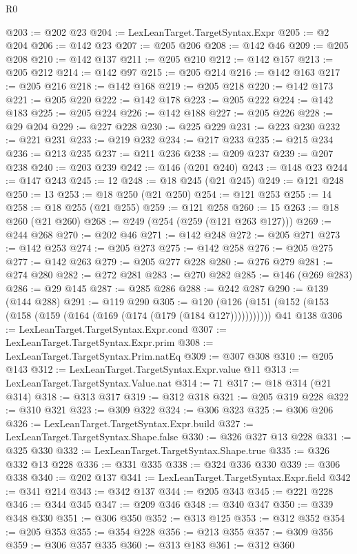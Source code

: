 \begin{lexlean}{R0}
\begin{coremodule}
@203 := @202 @23
@204 := LexLeanTarget.TargetSyntax.Expr
@205 := @2 @204
@206 := @142 @23
@207 := @205 @206
@208 := @142 @46
@209 := @205 @208
@210 := @142 @137
@211 := @205 @210
@212 := @142 @157
@213 := @205 @212
@214 := @142 @97
@215 := @205 @214
@216 := @142 @163
@217 := @205 @216
@218 := @142 @168
@219 := @205 @218
@220 := @142 @173
@221 := @205 @220
@222 := @142 @178
@223 := @205 @222
@224 := @142 @183
@225 := @205 @224
@226 := @142 @188
@227 := @205 @226
@228 := @29 @204
@229 := @227 @228
@230 := @225 @229
@231 := @223 @230
@232 := @221 @231
@233 := @219 @232
@234 := @217 @233
@235 := @215 @234
@236 := @213 @235
@237 := @211 @236
@238 := @209 @237
@239 := @207 @238
@240 := @203 @239
@242 := @146 (@201 @240)
@243 := @148 @23
@244 := @147 @243
@245 := 12
@248 := @18 @245 (@21 @245)
@249 := @121 @248
@250 := 13
@253 := @18 @250 (@21 @250)
@254 := @121 @253
@255 := 14
@258 := @18 @255 (@21 @255)
@259 := @121 @258
@260 := 15
@263 := @18 @260 (@21 @260)
@268 := @249 (@254 (@259 (@121 @263 @127)))
@269 := @244 @268
@270 := @202 @46
@271 := @142 @248
@272 := @205 @271
@273 := @142 @253
@274 := @205 @273
@275 := @142 @258
@276 := @205 @275
@277 := @142 @263
@279 := @205 @277 @228
@280 := @276 @279
@281 := @274 @280
@282 := @272 @281
@283 := @270 @282
@285 := @146 (@269 @283)
@286 := @29 @145
@287 := @285 @286
@288 := @242 @287
@290 := @139 (@144 @288)
@291 := @119 @290
@305 := @120
    (@126 (@151 (@152 (@153 (@158 (@159 (@164 (@169 (@174 (@179 (@184 @127)))))))))))
    @41
    @138
@306 := LexLeanTarget.TargetSyntax.Expr.cond
@307 := LexLeanTarget.TargetSyntax.Expr.prim
@308 := LexLeanTarget.TargetSyntax.Prim.natEq
@309 := @307 @308
@310 := @205 @143
@312 := LexLeanTarget.TargetSyntax.Expr.value @11
@313 := LexLeanTarget.TargetSyntax.Value.nat
@314 := 71
@317 := @18 @314 (@21 @314)
@318 := @313 @317
@319 := @312 @318
@321 := @205 @319 @228
@322 := @310 @321
@323 := @309 @322
@324 := @306 @323
@325 := @306 @206
@326 := LexLeanTarget.TargetSyntax.Expr.build
@327 := LexLeanTarget.TargetSyntax.Shape.false
@330 := @326 @327 @13 @228
@331 := @325 @330
@332 := LexLeanTarget.TargetSyntax.Shape.true
@335 := @326 @332 @13 @228
@336 := @331 @335
@338 := @324 @336 @330
@339 := @306 @338
@340 := @202 @137
@341 := LexLeanTarget.TargetSyntax.Expr.field
@342 := @341 @214
@343 := @342 @137
@344 := @205 @343
@345 := @221 @228
@346 := @344 @345
@347 := @209 @346
@348 := @340 @347
@350 := @339 @348 @330
@351 := @306 @350
@352 := @313 @125
@353 := @312 @352
@354 := @205 @353
@355 := @354 @228
@356 := @213 @355
@357 := @309 @356
@359 := @306 @357 @335
@360 := @313 @183
@361 := @312 @360

\end{coremodule}
\end{lexlean}
